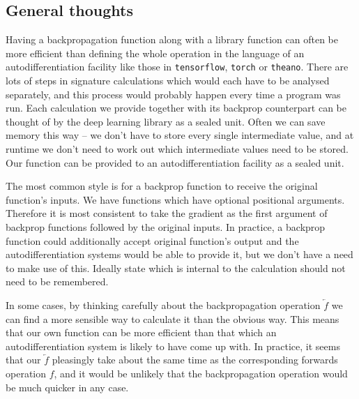 \subsection{General thoughts}
Having a backpropagation function along with a library function can often be more efficient than defining the whole operation in the language of an autodifferentiation facility like those in \verb|tensorflow|, \verb|torch| or \verb|theano|. There are lots of steps in signature calculations which would each have to be analysed separately, and this process would probably happen every time a program was run. Each calculation we provide together with its backprop counterpart can be thought of by the deep learning library as a sealed unit. Often we can save memory this way -- we don't have to store every single intermediate value, and at runtime we don't need to work out which intermediate values need to be stored. Our function can be provided to an autodifferentiation facility as a sealed unit.

The most common style is for a backprop function to receive the original function's inputs. We have functions which have optional positional arguments. Therefore it is most consistent to take the gradient as the first argument of backprop functions followed by the original inputs. In practice, a backprop function could additionally accept original function's output and the autodifferentiation systems would be able to provide it, 
but we don't have a need to make use of this. %
Ideally state which is internal to the calculation should not need to be remembered.

In some cases, by thinking carefully about the backpropagation operation $\overleftarrow{f}$ we can find a more sensible way to calculate it than the obvious way. This means that our own function can be more efficient than that which an autodifferentiation system is likely to have come up with. In practice, it seems that our $\overleftarrow{f}$ pleasingly take about the same time as the corresponding forwards operation $f$, and it would be unlikely that the backpropagation operation would be much quicker in any case.

